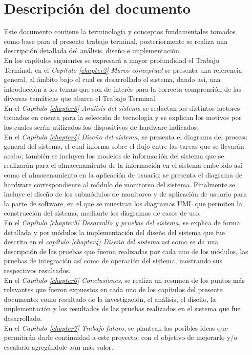 \section{Descripción del documento}
Este documento contiene la terminología y conceptos fundamentales tomados como base para el presente trabajo terminal, posteriormente se realiza una descripción detallada del análisis,  diseño e implementación. 
\\
En los capítulos siguientes se expresará a mayor profundidad el Trabajo Terminal, en el \textit{Capítulo \ref{chapter2} Marco conceptual} se presenta una referencia general, al ámbito bajo el cual es desarrollado el sistema, dando así, una introducción a los temas que son de interés para la correcta comprensión de las diversas temáticas que abarca el Trabajo Terminal.
\\
En el \textit{Capítulo \ref{chapter3} Análisis del sistema} se redactan los distintos factores tomados en cuenta para la selección de tecnología y se explican los motivos por los cuales serán utilizados los dispositivos de hardware indicados.
\\
En el \textit{Capítulo \ref{chapter4} Diseño del sistema}, se presenta el diagrama del proceso general del sistema, el cual informa sobre el flujo entre las tareas que se llevarán acabo; también se incluyen los modelos de información del sistema que se realizarán para el almacenamiento de la información en el sistema embebido así como el almacenamiento en la aplicación de usuario; se presenta el diagrama de hardware correspondiente al módulo de monitoreo del sistema. Finalmente se incluye el diseño de los submódulos de monitoreo y de aplicación de usuario para la parte de software, en el que se muestran los diagramas UML que permiten la construcción del sistema, mediante los diagramas de casos de uso.
\\
En el \textit{Capítulo \ref{chapter5} Desarrollo y pruebas del sistema}, se explica de forma detallada y por módulos la implementación del diseño del sistema que fue descrito en el \textit{capítulo \ref{chapter4} Diseño del sistema} así como se da una descripción de las pruebas que fueron realizadas por cada uno de los módulos, las pruebas de integración así como de operación del sistema, mostrando sus respectivos resultados.
\\
En el \textit{Capítulo \ref{chapter6} Conclusiones}, 
se realiza un resumen de los puntos más relevantes que fueron expuestos en cada uno de los capítulos del presente documento; como resultado de la investigación, el análisis, el diseño, la implementación y los resultados de las pruebas realizados en el sistema que fue desarrollado.   
\\
En el \textit{Capítulo \ref{chapter7} Trabajo futuro}, se plantean las posibles ideas que permitirán darle continuidad a este proyecto, con el objetivo de mejorarlo y/o escalarlo agregándole aún más valor.

